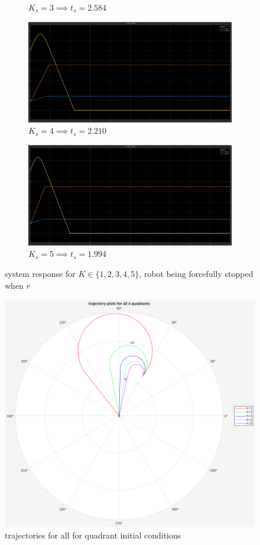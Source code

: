 \documentclass[12pt]{article}
\begin{document}
\begin{figure}[h]
\begin{subfigure}{.48\textwidth}
		\caption{\(K_s=3\implies t_s=2.584\)}
    \end{subfigure}
    \begin{subfigure}{.48\textwidth}
        \centering
        \includegraphics[width=0.9\linewidth]{images/K4.png}
		\caption{\(K_s=4\implies t_s=2.210\)}
    \end{subfigure}
	\begin{subfigure}{.48\textwidth}
        \centering
        \includegraphics[width=0.9\linewidth]{images/K5.png}
		\caption{\(K_s=5\implies t_s=1.994\)}
    \end{subfigure}
    \caption{system response for \(K\in\{1,2,3,4,5\}\), robot being forcefully stopped when \(r\)}
\end{figure}

\begin{figure}[ht!]
	\centering
	\includegraphics[width=0.5\linewidth]{images/K.png}
	\caption{trajectories for all for quadrant initial conditions}
\end{figure}
\end{document}

